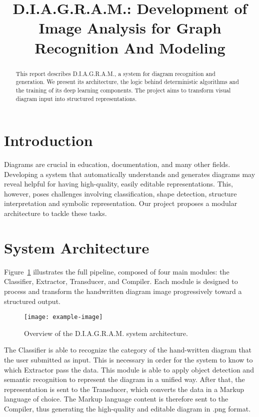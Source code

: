 \documentclass[conference]{IEEEtran}
\title{D.I.A.G.R.A.M.: Development of Image Analysis for Graph Recognition And Modeling}
\author{
    \IEEEauthorblockN{Filippo Garagnani, Saverio Napolitano, Nicola Ricciardi}
    \IEEEauthorblockA{
        'Computer Vision and Cognitive System' course \\
        \textit{Università di Modena e Reggio Emilia}
    }
}
\begin{document}
\maketitle

\begin{abstract}
This report describes D.I.A.G.R.A.M., a system for diagram recognition and generation. We present its architecture, the logic behind deterministic algorithms and the training of its deep learning components. The project aims to transform visual diagram input into structured representations.
\end{abstract}

\section{Introduction}
Diagrams are crucial in education, documentation, and many other fields. Developing a system that automatically understands and generates diagrams may reveal helpful for having high-quality, easily editable representations. This, however, poses challenges involving classification, shape detection, structure interpretation and symbolic representation. Our project proposes a modular architecture to tackle these tasks.

\section{System Architecture}
Figure~\ref{fig:pipeline} illustrates the full pipeline, composed of four main modules: the Classifier, Extractor, Transducer, and Compiler. Each module is designed to process and transform the handwritten diagram image progressively toward a structured output.

\begin{figure}[H]
\centering
\texttt{[image: example-image]}
\caption{Overview of the D.I.A.G.R.A.M. system architecture.}
\label{fig:pipeline}
\end{figure}

The Classifier is able to recognize the category of the hand-written diagram that the user submitted as input. This is necessary in order for the system to know to which Extractor pass the data. This module is able to apply object detection and semantic recognition to represent the diagram in a unified way. After that, the representation is sent to the Transducer, which converts the data in a Markup language of choice. The Markup language content is therefore sent to the Compiler, thus generating the high-quality and editable diagram in .png format.
\end{document}
